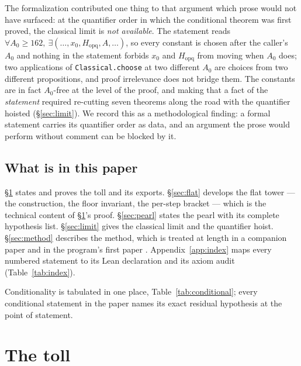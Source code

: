 \documentclass[11pt]{amsart}
\theoremstyle{remark}
\begin{document}
The formalization contributed one thing to that argument which prose would
not have surfaced: at the quantifier order in which the conditional
theorem was first proved, the classical limit is \emph{not available}. The
statement reads $\forall A_0 \ge 162,\ \exists (\ldots, x_0,
H_{\mathrm{opq}}, A, \ldots)$, so every constant is chosen after the
caller's $A_0$ and nothing in the statement forbids $x_0$ and
$H_{\mathrm{opq}}$ from moving when $A_0$ does; two applications of
\texttt{Classical.choose} at two different $A_0$ are choices from two
different propositions, and proof irrelevance does not bridge them. The
constants are in fact $A_0$-free at the level of the proof, and making
that a fact of the \emph{statement} required re-cutting seven theorems
along the road with the quantifier hoisted (\S\ref{sec:limit}). We record
this as a methodological finding: a formal statement carries its
quantifier order as data, and an argument the prose would perform without
comment can be blocked by it.

\subsection{What is in this paper}
\S\ref{sec:toll} states and proves the toll and its exports.
\S\ref{sec:flat} develops the flat tower --- the construction, the floor
invariant, the per-step bracket --- which is the technical content of
\S\ref{sec:toll}'s proof. \S\ref{sec:pearl} states the pearl with its
complete hypothesis list. \S\ref{sec:limit} gives the classical limit and
the quantifier hoist. \S\ref{sec:method} describes the method, which is
treated at length in a companion paper \cite{companion} and in the
program's first paper \cite{fulcrum}. Appendix~\ref{app:index} maps every
numbered statement to its Lean declaration and its axiom audit
(Table~\ref{tab:index}).

Conditionality is tabulated in one place, Table~\ref{tab:conditional};
every conditional statement in the paper names its exact residual
hypothesis at the point of statement.

\section{The toll}\label{sec:toll}
\end{document}
